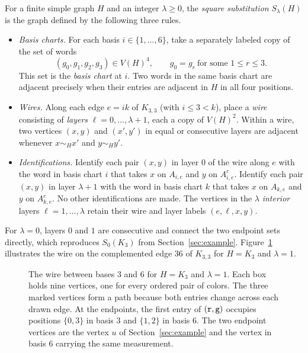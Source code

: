 For a finite simple graph $H$ and an integer $\lambda\ge0$, the \emph{square substitution} $S_\lambda(H)$ is the graph defined by the following three rules.
\begin{itemize}
\item \emph{Basis charts.} For each basis $i\in\{1,\ldots,6\}$, take a separately labeled copy of the set of words
\[
 (g_0,g_1,g_2,g_3)\in V(H)^4,\qquad
 g_0=g_r\ \text{for some }1\le r\le3.
\]
This set is the \emph{basis chart} at $i$. Two words in the same basis chart are adjacent precisely when their entries are adjacent in $H$ in all four positions.
\item \emph{Wires.} Along each edge $e=ik$ of $K_{3,3}$ (with $i\le3<k$), place a \emph{wire} consisting of \emph{layers} $\ell=0,\ldots,\lambda+1$, each a copy of $V(H)^2$. Within a wire, two vertices $(x,y)$ and $(x',y')$ in equal or consecutive layers are adjacent whenever $x\sim_H x'$ and $y\sim_H y'$.
\item \emph{Identifications.} Identify each pair $(x,y)$ in layer $0$ of the wire along $e$ with the word in basis chart $i$ that takes $x$ on $A_{i,e}$ and $y$ on $A_{i,e}^c$. Identify each pair $(x,y)$ in layer $\lambda+1$ with the word in basis chart $k$ that takes $x$ on $A_{k,e}$ and $y$ on $A_{k,e}^c$. No other identifications are made. The vertices in the $\lambda$ \emph{interior} layers $\ell=1,\ldots,\lambda$ retain their wire and layer labels $(e,\ell,x,y)$.
\end{itemize}
For $\lambda=0$, layers $0$ and $1$ are consecutive and connect the two endpoint sets directly, which reproduces $S_0(K_3)$ from Section~\ref{sec:example}. Figure~\ref{fig:wire} illustrates the wire on the complemented edge $36$ of $K_{3,3}$ for $H=K_3$ and $\lambda=1$.

\begin{figure}[htbp]
\centering
{}
\caption{The wire between bases $3$ and $6$ for $H=K_3$ and $\lambda=1$. Each box holds nine vertices, one for every ordered pair of colors. The three marked vertices form a path because both entries change across each drawn edge. At the endpoints, the first entry of $(\mathtt{r},\mathtt{g})$ occupies positions $\{0,3\}$ in basis $3$ and $\{1,2\}$ in basis $6$. The two endpoint vertices are the vertex $u$ of Section~\ref{sec:example} and the vertex in basis $6$ carrying the same measurement.}
\label{fig:wire}
\end{figure}

